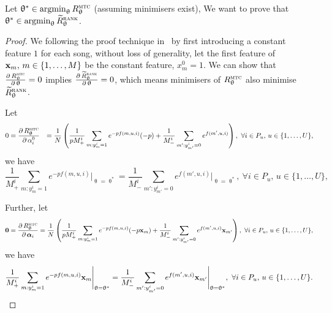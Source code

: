 Let $\uptheta^* \in \operatorname*{argmin}_{\uptheta} R_{\uptheta}^{\textsc{mtc}}$ (assuming minimisers exist),
We want to prove that $\uptheta^* \in \operatorname*{argmin}_{\uptheta} \widetilde R_{\uptheta}^{\textsc{rank}}$.

\begin{proof}
We following the proof technique in~\cite{ertekin2011equivalence}
by first introducing a constant feature $1$ for each song,
without loss of generality, let the first feature of $\mathbf{x}_m, \, m \in \{1,\dots,M\}$ be the constant feature, \ie $x_m^0 = 1$.
We can show that
$\frac{\partial \, R_{\uptheta}^{\textsc{mtc}}} {\partial \, \uptheta} = 0$ implies
$\frac{\partial \, \widetilde R_{\uptheta}^{\textsc{rank}}} {\partial \, \uptheta} = 0$,
which means minimisers of $R_{\uptheta}^{\textsc{mtc}}$ also minimise $\widetilde R_{\uptheta}^{\textsc{rank}}$.

Let 
\begin{equation*}
\begin{aligned}
0 
&= \frac{\partial \, R_{\uptheta}^{\textsc{mtc}}} {\partial \, \alpha_i^0}
&= \frac{1}{N} \left( 
   \frac{1}{p M_+^i} \sum_{m: y_m^i = 1} e^{-p f(m, u, i)} (-p)
   + \frac{1}{M_-^i} \sum_{m': y_{m'}^i = 0} e^{f(m', u, i)} \right),
\ \forall i \in P_u, \, u \in \{1,\dots,U\},
\end{aligned}
\end{equation*}
we have
\begin{equation}
\label{eq:eq1}
\frac{1}{M_+^i} \sum_{m: y_m^i = 1} e^{-p f(m, u, i)} \Bigg|_{\uptheta = \uptheta^*}
= \frac{1}{M_-^i} \sum_{m': y_{m'}^i = 0} e^{f(m', u, i)} \Bigg|_{\uptheta = \uptheta^*}, 
\ \forall i \in P_u, \, u \in \{1,\dots,U\},
\end{equation}

Further, let
\begin{equation*}
\mathbf{0} 
= \frac{\partial \, R_{\uptheta}^{\textsc{mtc}}} {\partial \, {\bm{\alpha}}_i} 
= \frac{1}{N} \left( 
   \frac{1}{p M_+^i} \sum_{m: y_m^i = 1} e^{-p f(m, u, i)} (-p \mathbf{x}_m)
   + \frac{1}{M_-^i} \sum_{m': y_{m'}^i = 0} e^{f(m', u, i)} \mathbf{x}_{m'} \right),
\ \forall i \in P_u, \, u \in \{1,\dots,U\},
\end{equation*}
we have
\begin{equation}
\label{eq:eq2}
\frac{1}{M_+^i} \sum_{m: y_m^i = 1} e^{-p f(m, u, i)} \mathbf{x}_m \Bigg|_{\uptheta = \uptheta^*}
= \frac{1}{M_-^i} \sum_{m': y_{m'}^i = 0} e^{f(m', u, i)} \mathbf{x}_{m'} \Bigg|_{\uptheta = \uptheta^*},
\ \forall i \in P_u, \, u \in \{1,\dots,U\}.
\end{equation}


\end{proof}
